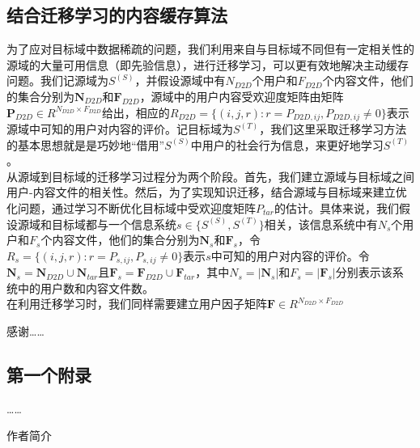 \documentclass[bachelor]{seuthesis} %
\begin{document}
\begin{Main}
\section{结合迁移学习的内容缓存算法}
为了应对目标域中数据稀疏的问题，我们利用来自与目标域不同但有一定相关性的源域的大量可用信息（即先验信息），进行迁移学习，可以更有效地解决主动缓存问题。我们记源域为$S^(S)$，并假设源域中有$N_{D2D}$个用户和$F_{D2D}$个内容文件，他们的集合分别为$\textbf{N}_{D2D}$和$\textbf{F}_{D2D}$，源域中的用户内容受欢迎度矩阵由矩阵$\textbf{P}_{D2D}\in R^{N_{D2D}\times F_{D2D}}$给出，相应的$R_{D2D}=\{(i,j,r):r=P_{D2D,ij},P_{D2D,ij}\neq0\}$表示源域中可知的用户对内容的评价。记目标域为$S^(T)$，我们这里采取迁移学习方法的基本思想就是是巧妙地“借用”$S^(S)$中用户的社会行为信息，来更好地学习$S^(T)$。\\
从源域到目标域的迁移学习过程分为两个阶段。首先，我们建立源域与目标域之间用户-内容文件的相关性。然后，为了实现知识迁移，结合源域与目标域来建立优化问题，通过学习不断优化目标域中受欢迎度矩阵$P_{tar}$的估计。具体来说，我们假设源域和目标域都与一个信息系统$s\in\{S^(S),S^(T)\}$相关，该信息系统中有$N_{s}$个用户和$F_{s}$个内容文件，他们的集合分别为$\textbf{N}_{s}$和$\textbf{F}_{s}$，令$R_{s}=\{(i,j,r):r=P_{s,ij},P_{s,ij}\neq0\}$表示$s$中可知的用户对内容的评价。令$\textbf{N}_{s}=\textbf{N}_{D2D}\cup\textbf{N}_{tar}$且$\textbf{F}_{s}=\textbf{F}_{D2D}\cup\textbf{F}_{tar}$，其中$N_s=|\textbf{N}_{s}|$和$F_s=|\textbf{F}_{s}|$分别表示该系统中的用户数和内容文件数。\\
在利用迁移学习时，我们同样需要建立用户因子矩阵$\textbf{F}
\in R^{N_{D2D}\times F_{D2D}}$

\end{Main} %

\begin{Acknowledgement}
感谢……
\end{Acknowledgement}



\begin{Appendix}
  \chapter{第一个附录}
  ……
\end{Appendix}

\newpage
\printindex %



%
%




\begin{Resume}
作者简介
\end{Resume}
\end{document}
